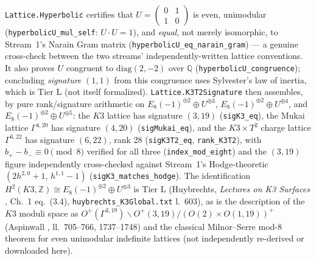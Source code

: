 \documentclass[11pt,a4paper]{article}
\theoremstyle{remark}
\begin{document}
\texttt{Lattice.Hyperbolic} certifies that $U=\begin{pmatrix}0&1\\1&0\end{pmatrix}$ is even,
unimodular (\texttt{hyperbolicU\_\discretionary{}{}{}mul\_\discretionary{}{}{}self}: $U\cdot U=1$),
and \emph{equal}, not merely isomorphic, to Stream~1's Narain Gram matrix
(\texttt{hyperbolicU\_\discretionary{}{}{}eq\_\discretionary{}{}{}narain\_\discretionary{}{}{}gram}) ---
a genuine cross-check between the two streams' independently-written lattice conventions. It also
proves $U$ congruent to $\mathrm{diag}(2,-2)$ over $\mathbb Q$
(\texttt{hyperbolicU\_\discretionary{}{}{}congruence}); concluding \emph{signature} $(1,1)$ from this
congruence uses Sylvester's law of inertia, which is Tier L (not itself formalized).
\texttt{Lattice.K3T2Signature} then assembles, by pure rank/signature arithmetic on
$E_8(-1)^{\oplus2}\oplus U^{\oplus3}$, $E_8(-1)^{\oplus2}\oplus U^{\oplus4}$, and
$E_8(-1)^{\oplus2}\oplus U^{\oplus5}$: the $K3$ lattice has signature $(3,19)$
(\texttt{sigK3\_\discretionary{}{}{}eq}), the Mukai lattice $\Gamma^{4,20}$ has signature $(4,20)$
(\texttt{sigMukai\_\discretionary{}{}{}eq}), and the $K3\times T^2$ charge lattice $\Gamma^{6,22}$ has
signature $(6,22)$, rank 28 (\texttt{sigK3T2\_\discretionary{}{}{}eq},
\texttt{rank\_\discretionary{}{}{}K3T2}), with $b_+-b_-\equiv0\pmod 8$ verified for all three
(\texttt{index\_\discretionary{}{}{}mod\_\discretionary{}{}{}eight}) and the $(3,19)$ figure
independently cross-checked against Stream~1's Hodge-theoretic
$(2h^{2,0}+1,\,h^{1,1}-1)$ (\texttt{sigK3\_\discretionary{}{}{}matches\_\discretionary{}{}{}hodge}).
The identification $H^2(K3,\mathbb Z)\cong E_8(-1)^{\oplus2}\oplus U^{\oplus3}$ is Tier L (Huybrechts,
\textit{Lectures on K3 Surfaces} \cite{Huybrechts2016}, Ch.~1 eq.~(3.4),
\texttt{huybrechts\_K3Global.txt} l.~603), as is the description of the $K3$ moduli space as
$O^+(\Gamma^{3,19})\backslash O^+(3,19)/(O(2)\times O(1,19))^+$ (Aspinwall
\cite{Aspinwall1996}, ll.~705--766, 1737--1748) and the classical Milnor--Serre mod-8 theorem for
even unimodular indefinite lattices (not independently re-derived or downloaded here).
\end{document}
